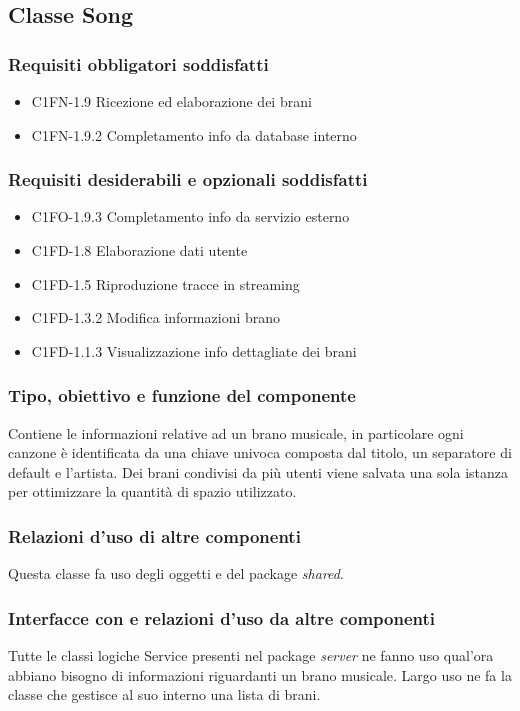 \subsection{Classe Song}
\subsubsection*{Requisiti obbligatori soddisfatti}
\begin{itemize}
	\item C1FN-1.9 Ricezione ed elaborazione dei brani
	\item C1FN-1.9.2 Completamento info da database interno
\end{itemize}
\subsubsection*{Requisiti desiderabili e opzionali soddisfatti}
\begin{itemize}
    \item C1FO-1.9.3 Completamento info da servizio esterno
    \item C1FD-1.8 Elaborazione dati utente
    \item C1FD-1.5 Riproduzione tracce in streaming
    \item C1FD-1.3.2 Modifica informazioni brano
    \item C1FD-1.1.3 Visualizzazione info dettagliate dei brani
\end{itemize}
\subsubsection*{Tipo, obiettivo e funzione del componente} Contiene le
informazioni relative ad un brano musicale, in particolare ogni canzone \`e
identificata da una chiave univoca composta dal titolo, un separatore di default
e l'artista. Dei brani condivisi da pi\`u utenti viene salvata una sola istanza
per ottimizzare la quantit\`a di spazio utilizzato.
\subsubsection*{Relazioni d'uso di altre componenti} Questa classe fa uso degli
oggetti  e  del package \emph{shared}. 
\subsubsection*{Interfacce con e
relazioni d'uso da altre componenti} Tutte le classi logiche Service presenti nel package
\emph{server} ne fanno uso qual'ora abbiano bisogno di informazioni riguardanti
un brano musicale. Largo uso ne fa la classe  che gestisce al
suo interno una lista di brani. 
